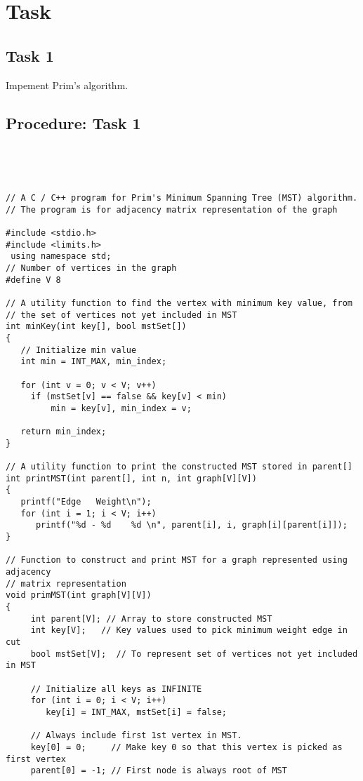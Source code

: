 \documentclass[11pt]{article}            %
\begin{document}
\section{Task}  

\subsection{ Task 1 }     

Impement  Prim's algorithm.

\subsection{Procedure: Task 1 }    
 

\begin{lstlisting}




// A C / C++ program for Prim's Minimum Spanning Tree (MST) algorithm. 
// The program is for adjacency matrix representation of the graph
 
#include <stdio.h>
#include <limits.h>
 using namespace std;
// Number of vertices in the graph
#define V 8
 
// A utility function to find the vertex with minimum key value, from
// the set of vertices not yet included in MST
int minKey(int key[], bool mstSet[])
{
   // Initialize min value
   int min = INT_MAX, min_index;
 
   for (int v = 0; v < V; v++)
     if (mstSet[v] == false && key[v] < min)
         min = key[v], min_index = v;
 
   return min_index;
}
 
// A utility function to print the constructed MST stored in parent[]
int printMST(int parent[], int n, int graph[V][V])
{
   printf("Edge   Weight\n");
   for (int i = 1; i < V; i++)
      printf("%d - %d    %d \n", parent[i], i, graph[i][parent[i]]);
}
 
// Function to construct and print MST for a graph represented using adjacency
// matrix representation
void primMST(int graph[V][V])
{
     int parent[V]; // Array to store constructed MST
     int key[V];   // Key values used to pick minimum weight edge in cut
     bool mstSet[V];  // To represent set of vertices not yet included in MST
 
     // Initialize all keys as INFINITE
     for (int i = 0; i < V; i++)
        key[i] = INT_MAX, mstSet[i] = false;
 
     // Always include first 1st vertex in MST.
     key[0] = 0;     // Make key 0 so that this vertex is picked as first vertex
     parent[0] = -1; // First node is always root of MST 
 

\end{lstlisting}
\end{document}
